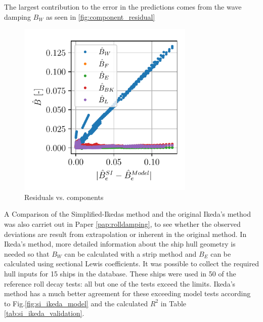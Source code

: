 \noindent The largest contribution to the error in the predictions comes from the wave damping $B_W$ as seen in \autoref{fig:component_residual}
\begin{figure}[!htb]
    \includegraphics[width=0.75\textwidth]{kappa/images/component_residual.pdf}
    \caption{Residuals vs. components}
    \label{fig:component_residual}
\end{figure}
A Comparison of the Simplified-Ikedas method and the original Ikeda's method was also carriet out in Paper \ref{pap:rolldamping}, to see whether the observed deviations are result from extrapolation or inherent in the original method. In Ikeda's method, more detailed information about the ship hull geometry is needed so that $B_W$ can be calculated with a strip method and $B_E$ can be calculated using sectional Lewis coefficients. It was possible to collect the required hull inputs for 15 ships in the database. These ships were used in 50 of the reference roll decay tests: all but one of the tests exceed the limits. Ikeda's method has a much better agreement for these exceeding model tests according to Fig.\ref{fig:si_ikeda_model} and the calculated $R^2$ in Table \ref{tab:si_ikeda_validation}.

